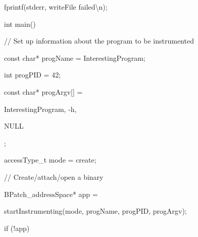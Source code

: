 {{{{{{{{{{{

fprintf(stderr, {\textquotedbl}writeFile failed{\textbackslash}n{\textquotedbl});}



{

}}



{

}}



{

}}





\bigskip



{

int main() {}



{

// Set up information about the program to be instrumented}



{

const char* progName = {\textquotedbl}InterestingProgram{\textquotedbl};}



{

int progPID = 42;}



{

const char* progArgv[] = {{\textquotedbl}InterestingProgram{\textquotedbl}, {\textquotedbl}-h{\textquotedbl},

NULL};}



{

accessType_t mode = create;}





\bigskip



{

// Create/attach/open a binary}



{

BPatch_addressSpace* app =



{

startInstrumenting(mode, progName, progPID, progArgv);}



{

if (!app) {}



}}}}}}}}}}
